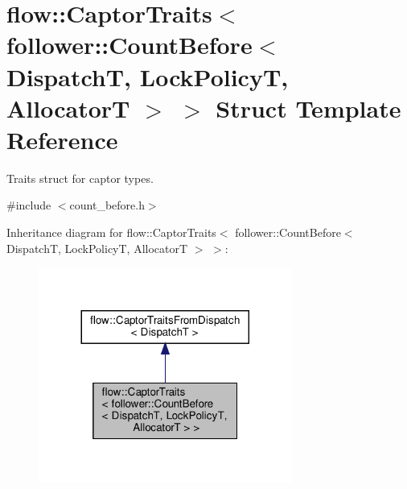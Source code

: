 \hypertarget{structflow_1_1_captor_traits_3_01follower_1_1_count_before_3_01_dispatch_t_00_01_lock_policy_t_00_01_allocator_t_01_4_01_4}{}\section{flow\+:\+:Captor\+Traits$<$ follower\+:\+:Count\+Before$<$ DispatchT, Lock\+PolicyT, AllocatorT $>$ $>$ Struct Template Reference}
\label{structflow_1_1_captor_traits_3_01follower_1_1_count_before_3_01_dispatch_t_00_01_lock_policy_t_00_01_allocator_t_01_4_01_4}


Traits struct for captor types.  




{\ttfamily \#include $<$count\+\_\+before.\+h$>$}



Inheritance diagram for flow\+:\+:Captor\+Traits$<$ follower\+:\+:Count\+Before$<$ DispatchT, Lock\+PolicyT, AllocatorT $>$ $>$\+:\nopagebreak
\begin{figure}[H]
\begin{center}
\leavevmode
\includegraphics[width=236pt]{structflow_1_1_captor_traits_3_01follower_1_1_count_before_3_01_dispatch_t_00_01_lock_policy_t_094710abd2145fba25f9537fb38754d27}
\end{center}
\end{figure}


